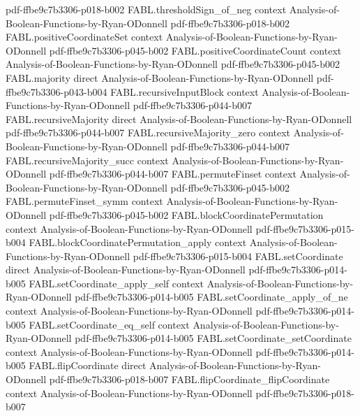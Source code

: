 \begin{theorem}
  {pdf-ffbe9c7b3306-p018-b002}
\proofstep
  {FABL.thresholdSign_of_neg}
  {context}
  {Analysis-of-Boolean-Functions-by-Ryan-ODonnell}
  {pdf-ffbe9c7b3306-p018-b002}
\proofstep
  {FABL.positiveCoordinateSet}
  {context}
  {Analysis-of-Boolean-Functions-by-Ryan-ODonnell}
  {pdf-ffbe9c7b3306-p045-b002}
\proofstep
  {FABL.positiveCoordinateCount}
  {context}
  {Analysis-of-Boolean-Functions-by-Ryan-ODonnell}
  {pdf-ffbe9c7b3306-p045-b002}
\proofstep
  {FABL.majority}
  {direct}
  {Analysis-of-Boolean-Functions-by-Ryan-ODonnell}
  {pdf-ffbe9c7b3306-p043-b004}
\proofstep
  {FABL.recursiveInputBlock}
  {context}
  {Analysis-of-Boolean-Functions-by-Ryan-ODonnell}
  {pdf-ffbe9c7b3306-p044-b007}
\proofstep
  {FABL.recursiveMajority}
  {direct}
  {Analysis-of-Boolean-Functions-by-Ryan-ODonnell}
  {pdf-ffbe9c7b3306-p044-b007}
\proofstep
  {FABL.recursiveMajority_zero}
  {context}
  {Analysis-of-Boolean-Functions-by-Ryan-ODonnell}
  {pdf-ffbe9c7b3306-p044-b007}
\proofstep
  {FABL.recursiveMajority_succ}
  {context}
  {Analysis-of-Boolean-Functions-by-Ryan-ODonnell}
  {pdf-ffbe9c7b3306-p044-b007}
\proofstep
  {FABL.permuteFinset}
  {context}
  {Analysis-of-Boolean-Functions-by-Ryan-ODonnell}
  {pdf-ffbe9c7b3306-p045-b002}
\proofstep
  {FABL.permuteFinset_symm}
  {context}
  {Analysis-of-Boolean-Functions-by-Ryan-ODonnell}
  {pdf-ffbe9c7b3306-p045-b002}
\proofstep
  {FABL.blockCoordinatePermutation}
  {context}
  {Analysis-of-Boolean-Functions-by-Ryan-ODonnell}
  {pdf-ffbe9c7b3306-p015-b004}
\proofstep
  {FABL.blockCoordinatePermutation_apply}
  {context}
  {Analysis-of-Boolean-Functions-by-Ryan-ODonnell}
  {pdf-ffbe9c7b3306-p015-b004}
\proofstep
  {FABL.setCoordinate}
  {direct}
  {Analysis-of-Boolean-Functions-by-Ryan-ODonnell}
  {pdf-ffbe9c7b3306-p014-b005}
\proofstep
  {FABL.setCoordinate_apply_self}
  {context}
  {Analysis-of-Boolean-Functions-by-Ryan-ODonnell}
  {pdf-ffbe9c7b3306-p014-b005}
\proofstep
  {FABL.setCoordinate_apply_of_ne}
  {context}
  {Analysis-of-Boolean-Functions-by-Ryan-ODonnell}
  {pdf-ffbe9c7b3306-p014-b005}
\proofstep
  {FABL.setCoordinate_eq_self}
  {context}
  {Analysis-of-Boolean-Functions-by-Ryan-ODonnell}
  {pdf-ffbe9c7b3306-p014-b005}
\proofstep
  {FABL.setCoordinate_setCoordinate}
  {context}
  {Analysis-of-Boolean-Functions-by-Ryan-ODonnell}
  {pdf-ffbe9c7b3306-p014-b005}
\proofstep
  {FABL.flipCoordinate}
  {direct}
  {Analysis-of-Boolean-Functions-by-Ryan-ODonnell}
  {pdf-ffbe9c7b3306-p018-b007}
\proofstep
  {FABL.flipCoordinate_flipCoordinate}
  {context}
  {Analysis-of-Boolean-Functions-by-Ryan-ODonnell}
  {pdf-ffbe9c7b3306-p018-b007}

\end{theorem}
